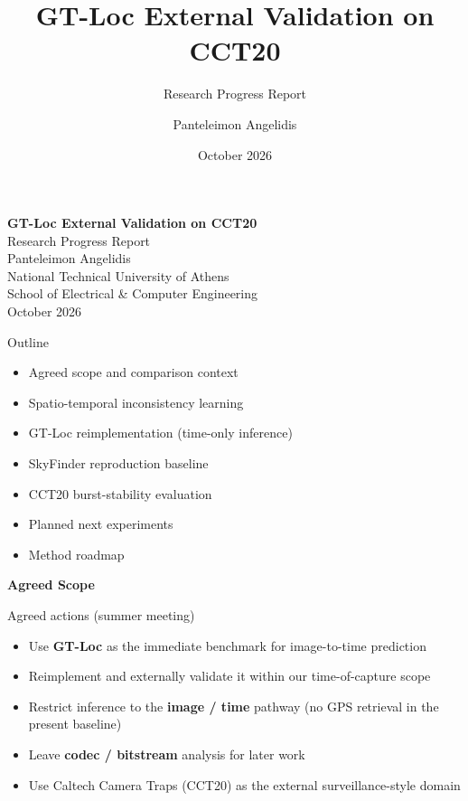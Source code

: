 \documentclass[aspectratio=169,11pt]{beamer}
\title{GT-Loc External Validation on CCT20}
\subtitle{Research Progress Report}
\author{Panteleimon Angelidis}
\institute{National Technical University of Athens\\
School of Electrical \& Computer Engineering}
\date{October 2026}
\begin{document}
\begin{frame}[plain]
\vspace{1.6cm}
\begin{center}
{\color{aiia}\LARGE\bfseries GT-Loc External Validation on CCT20}\\[0.55em]
{\large Research Progress Report}\\[1.4em]
{\color{muted}Panteleimon Angelidis}\\[0.25em]
{\footnotesize\color{muted}National Technical University of Athens\\
School of Electrical \& Computer Engineering}\\[1.2em]
{\footnotesize\color{muted}October 2026}
\end{center}
\end{frame}

\begin{frame}{Outline}
\begin{itemize}
  \item Agreed scope and comparison context
  \item Spatio-temporal inconsistency learning
  \item GT-Loc reimplementation (time-only inference)
  \item SkyFinder reproduction baseline
  \item CCT20 burst-stability evaluation
  \item Planned next experiments
  \item Method roadmap
\end{itemize}
\end{frame}

\begin{frame}[plain]
\begin{center}
\vspace{2.4cm}
{\color{aiia}\Huge\bfseries Agreed Scope}
\end{center}
\end{frame}

\begin{frame}{Agreed actions (summer meeting)}
\begin{itemize}
  \item Use \textbf{GT-Loc} as the immediate benchmark for image-to-time prediction
  \item Reimplement and externally validate it within our time-of-capture scope
  \item Restrict inference to the \textbf{image / time} pathway (no GPS retrieval in the present baseline)
  \item Leave \textbf{codec / bitstream} analysis for later work
  \item Use Caltech Camera Traps (CCT20) as the external surveillance-style domain
\end{itemize}
\end{frame}
\end{document}
